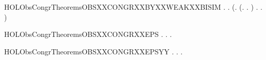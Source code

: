 \begin{SaveVerbatim}{HOLObsCongrTheoremsOBSXXCONGRXXBYXXWEAKXXBISIM}
\HOLTokenTurnstile{} \HOLSymConst{\HOLTokenForall{}}.
         \HOLSymConst{\HOLTokenImp{}}
       \HOLSymConst{\HOLTokenForall{}} .
           (\HOLSymConst{\HOLTokenForall{}}.
                (\HOLSymConst{\HOLTokenForall{}}.  \HOLTokenTransBegin{}\HOLTokenTransEnd {} \HOLSymConst{\HOLTokenImp{}} \HOLSymConst{\HOLTokenExists{}}.  \HOLTokenWeakTransBegin{}\HOLTokenWeakTransEnd {} \HOLSymConst{\HOLTokenConj{}}   ) \HOLSymConst{\HOLTokenConj{}}
                \HOLSymConst{\HOLTokenForall{}}.  \HOLTokenTransBegin{}\HOLTokenTransEnd {} \HOLSymConst{\HOLTokenImp{}} \HOLSymConst{\HOLTokenExists{}}.  \HOLTokenWeakTransBegin{}\HOLTokenWeakTransEnd {} \HOLSymConst{\HOLTokenConj{}}   ) \HOLSymConst{\HOLTokenImp{}}
             
\end{SaveVerbatim}
\newcommand{\HOLObsCongrTheoremsOBSXXCONGRXXBYXXWEAKXXBISIM}{\UseVerbatim{HOLObsCongrTheoremsOBSXXCONGRXXBYXXWEAKXXBISIM}}
\begin{SaveVerbatim}{HOLObsCongrTheoremsOBSXXCONGRXXEPS}
\HOLTokenTurnstile{} \HOLSymConst{\HOLTokenForall{}} .
          \HOLSymConst{\HOLTokenImp{}}
       \HOLSymConst{\HOLTokenForall{}}.    \HOLSymConst{\HOLTokenImp{}} \HOLSymConst{\HOLTokenExists{}}.    \HOLSymConst{\HOLTokenConj{}}   
\end{SaveVerbatim}
\newcommand{\HOLObsCongrTheoremsOBSXXCONGRXXEPS}{\UseVerbatim{HOLObsCongrTheoremsOBSXXCONGRXXEPS}}
\begin{SaveVerbatim}{HOLObsCongrTheoremsOBSXXCONGRXXEPSYY}
\HOLTokenTurnstile{} \HOLSymConst{\HOLTokenForall{}} .
          \HOLSymConst{\HOLTokenImp{}}
       \HOLSymConst{\HOLTokenForall{}}.    \HOLSymConst{\HOLTokenImp{}} \HOLSymConst{\HOLTokenExists{}}.    \HOLSymConst{\HOLTokenConj{}}   
\end{SaveVerbatim}
